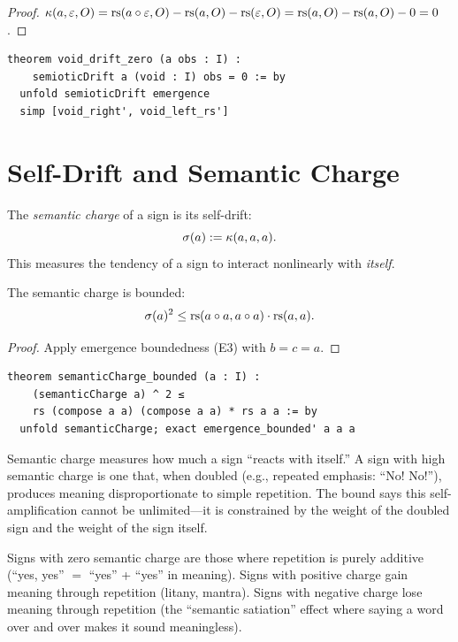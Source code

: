 \begin{proof}
$\kappa(a, \varepsilon, O) = \mathrm{rs}(a \circ \varepsilon, O) - \mathrm{rs}(a, O) - \mathrm{rs}(\varepsilon, O)
= \mathrm{rs}(a, O) - \mathrm{rs}(a, O) - 0 = 0$.
\end{proof}

\begin{lstlisting}
theorem void_drift_zero (a obs : I) :
    semioticDrift a (void : I) obs = 0 := by
  unfold semioticDrift emergence
  simp [void_right', void_left_rs']
\end{lstlisting}

\section{Self-Drift and Semantic Charge}

\begin{definition}
The \emph{semantic charge} of a sign is its self-drift:
\[
  \sigma(a) := \kappa(a, a, a).
\]
This measures the tendency of a sign to interact nonlinearly with
\emph{itself}.
\end{definition}

\begin{theorem}
\label{thm:charge-bound}
The semantic charge is bounded:
\[
  \sigma(a)^2 \leq \mathrm{rs}(a \circ a, a \circ a) \cdot \mathrm{rs}(a, a).
\]
\end{theorem}

\begin{proof}
Apply emergence boundedness (E3) with $b = c = a$.
\end{proof}

\begin{lstlisting}
theorem semanticCharge_bounded (a : I) :
    (semanticCharge a) ^ 2 ≤
    rs (compose a a) (compose a a) * rs a a := by
  unfold semanticCharge; exact emergence_bounded' a a a
\end{lstlisting}

\begin{remark}
Semantic charge measures how much a sign ``reacts with itself.''
A sign with high semantic charge is one that, when doubled (e.g.,
repeated emphasis: ``No! No!''), produces meaning disproportionate
to simple repetition.  The bound says this self-amplification
cannot be unlimited---it is constrained by the weight of the doubled
sign and the weight of the sign itself.

Signs with zero semantic charge are those where repetition is purely
additive (``yes, yes'' $=$ ``yes'' + ``yes'' in meaning).  Signs with
positive charge gain meaning through repetition (litany, mantra).
Signs with negative charge lose meaning through repetition (the
``semantic satiation'' effect where saying a word over and over makes
it sound meaningless).
\end{remark}


